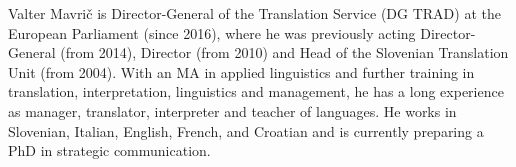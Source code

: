 Valter Mavrič is Director-General of the Translation Service (DG TRAD) at the European Parliament (since 2016), where he was previously acting Director-General (from 2014), Director (from 2010) and Head of the Slovenian Translation Unit (from 2004). With an MA in applied linguistics and further training in translation, interpretation, linguistics and management, he has a long experience as manager, translator, interpreter and teacher of languages. He works in Slovenian, Italian, English, French, and Croatian and is currently preparing a PhD in strategic communication.
